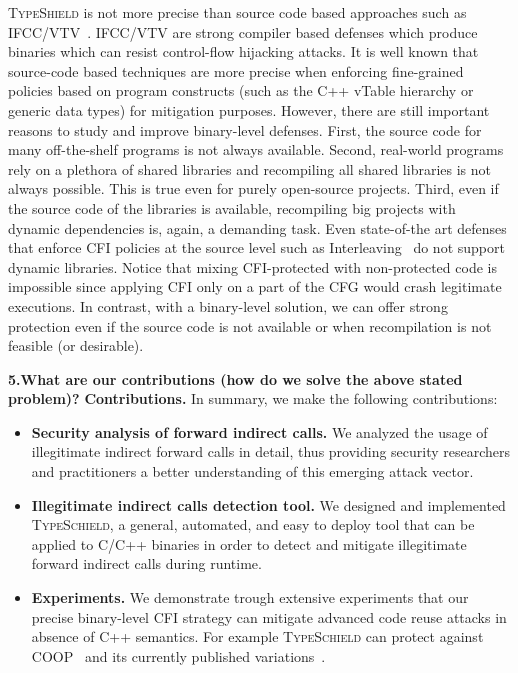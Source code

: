 \textsc{TypeShield} is not more precise than source code based
approaches such as IFCC/VTV~\cite{vtv:tice}.
IFCC/VTV are strong compiler based defenses which produce binaries which can resist control-flow
hijacking attacks. It is well known that source-code based techniques are more precise 
when enforcing fine-grained policies based on program constructs (such as
the C++ vTable hierarchy or generic data types) for mitigation
purposes. However, there are still important reasons to study
and improve binary-level defenses. First, the source code
for many off-the-shelf programs is not always available.
Second, real-world programs rely on a plethora of shared
libraries and recompiling all shared libraries is not always
possible. This is true even for purely open-source projects.
Third, even if the source code of the libraries is
available, recompiling big projects with dynamic dependencies is, 
again, a demanding task. Even state-of-the art
defenses that enforce CFI policies at the source level such
as Interleaving~\cite{bounov:interleaving} do not support dynamic libraries.
Notice that mixing CFI-protected with non-protected code is impossible since
applying CFI only on a part of the CFG would crash legitimate executions.
In contrast, with a binary-level solution, we
can offer strong protection even if the source code is not
available or when recompilation is not feasible (or desirable).

\textbf{5.What are our contributions (how do we solve the above stated problem)?}
\textbf{Contributions.} In summary, we make the following contributions:
\label{Contribution}
\begin{itemize}
 \item \textbf{Security analysis of forward indirect calls.} 
 We analyzed the usage of illegitimate indirect forward calls in detail,
 thus providing security researchers and
practitioners a better understanding of this emerging
attack vector.

 \item \textbf{Illegitimate indirect calls detection tool.}
 We designed and implemented \textsc{TypeSchield}, a general, automated, and easy to deploy tool
 that can be applied to C/C++ binaries in order to detect and mitigate illegitimate forward indirect calls 
 during runtime. 
 
 \item \textbf{Experiments.} We demonstrate trough extensive experiments that our precise
 binary-level CFI strategy can mitigate advanced code reuse attacks in absence of C++ semantics.
 For example \textsc{TypeSchield} can protect against COOP~\cite{schuster:coop} and its currently published 
 variations~\cite{ctf:coop, crane:readactor++, loop:oriented, subversive-c:lettner}.
  
\end{itemize}

